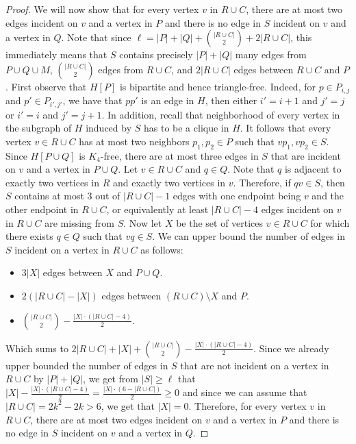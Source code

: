 \begin{proof}
We will now show that for every vertex $v$ in $R\cup C$, there are at most two edges incident on $v$ and a vertex in $P$ and there is no edge in $S$ incident on $v$ and a vertex in $Q$.  
Note that since $\ell = |P|+ |Q| + \binom{|R\cup C|}{2} + 2|R\cup C| $, this immediately means that $S$ contains precisely  $|P|+ |Q|$ many edges from $P\cup Q\cup M$, $\binom{|R\cup C|}{2}$ edges from $R\cup C$, and $2|R\cup C|$ edges between  $R\cup C$ and $P$. 
First observe that $H[P]$ is bipartite and hence triangle-free. Indeed, for $p\in P_{i,j}$ and $p'\in P_{i',j'}$, we have that $pp'$ is an edge in $H$, then either $i'=i+1$ and $j'=j$ or $i'=i$ and $j'=j+1$. In addition, recall that neighborhood of every vertex in the subgraph of $H$ induced by $S$ has to be a clique in $H$. It follows that every vertex $v\in R\cup C$ has at most two neighbors $p_1, p_2\in P$ such that $vp_1, vp_2\in S$. Since $H[P\cup Q]$ is $K_4$-free, there are at most three edges in $S$ that are incident on $v$ and a vertex in $P\cup Q$.
Let $v\in R\cup C$ and $q\in Q$. Note that $q$ is adjacent to exactly two vertices in $R$ and exactly two vertices in $v$. Therefore, if $qv\in S$, then $S$ contains at most $3$ out of $|R\cup C|-1$ edges with one endpoint being $v$ and the other endpoint in $R\cup C$, or equivalently at least $|R\cup C|-4$ edges incident on $v$ in $R\cup C$ are missing from $S$. Now let $X$ be the set of vertices $v\in R\cup C$ for which there exists $q\in Q$ such that $vq\in S$. We can upper bound the number of edges in $S$ incident on a vertex in $R\cup C$ as follows: 
\begin{itemize}
\item $3|X|$ edges between $X$ and $P\cup Q$.
\item $2(|R\cup C| - |X|)$ edges between $(R\cup C)\setminus X$ and $P$.
\item $\binom{|R\cup C|}{2} - \frac{|X|\cdot (|R\cup C| - 4)}{2}$. 
\end{itemize}
Which sums to $2|R\cup C| + |X| + \binom{|R\cup C|}{2} - \frac{|X|\cdot (|R\cup C| - 4)}{2}$. Since we already upper bounded the number of edges in $S$ that are not incident on a vertex in $R\cup C$ by $|P|+|Q|$, we get from $|S|\ge \ell$ that $|X| - \frac{|X|\cdot (|R\cup C| - 4)}{2} = \frac{|X|\cdot (6-|R\cup C|)}{2}  \ge 0$ and since we can assume that $|R\cup C| = 2k^2- 2k > 6$, we get that $|X| = 0$. Therefore, for every vertex $v$ in $R\cup C$, there are at most two edges incident on $v$ and a vertex in $P$ and there is no edge in $S$ incident on $v$ and a vertex in $Q$.


\end{proof}

